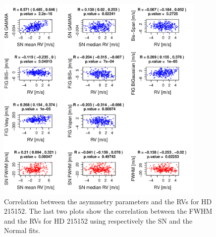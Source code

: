 \documentclass[11pt, oneside]{article}
\begin{document}
%
\begin{figure}[htbp]
   \centering
\includegraphics[height = 4in]{HD21515_[4]Comparison_para.pdf}  
   \caption{Correlation between the asymmetry parameters and the RVs for HD 215152. The last two plots show the correlation between the FWHM and the RVs for HD 215152 using respectively the SN and the Normal fits.}
   \label{fig:HD215152:corrPlot}
\end{figure}

\end{document}
